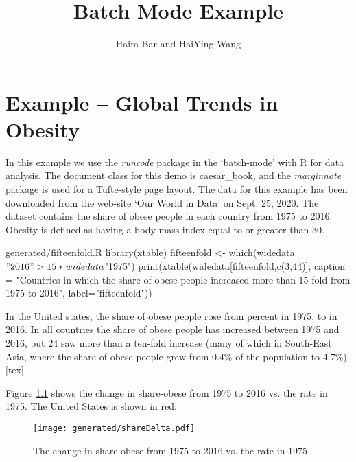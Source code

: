 \documentclass{caesar_book}
\title{Batch Mode Example}
\author{Haim Bar and HaiYing Wang}
\begin{document}
\mainmatter
\chapter{Example -- Global Trends in Obesity}
In this example  we use the \textit{runcode} package in the `batch-mode' with R for data analysis. The document class for this demo is caesar\_book, and the \textit{marginnote} package is used for a Tufte-style page layout.
The data for this example has been downloaded from the web-site `Our World in Data'
 on Sept. 25, 2020. The dataset contains the share of obese people in each country from 1975 to 2016. Obesity is defined as having a body-mass index equal to or greater than 30.

\begin{filecontents*}{generated/fifteenfold.R}
library(xtable)
fifteenfold <- which(widedata$"2016" > 15*widedata$"1975")
print(xtable(widedata[fifteenfold,c(3,44)], caption = "Countries in which the share of obese people increased more than 15-fold from 1975 to 2016", label="fifteenfold"))
\end{filecontents*}

In the United states, the share of obese people rose from   percent in 1975, to  in 2016. 
In all countries the share of obese people has increased between 1975 and 2016, but 24 saw more than a ten-fold increase (many of which in South-East Asia, where the share of obese people grew from 0.4\% of the population to 4.7\%).
[tex]

Figure \ref{sharegain} shows the change in share-obese from 1975 to 2016 vs. the rate in 1975. The United States is shown in red.

\begin{figure}[t]
\begin{center}
\texttt{[image: generated/shareDelta.pdf]}
\caption{The change in share-obese from 1975 to 2016 vs. the rate in 1975}
\label{sharegain}
\end{center}
\end{figure}
\end{document}
